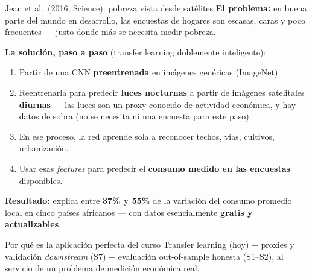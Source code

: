 \documentclass{beamer}
\newcommand{\1}{\mathbb{I}}
\begin{document}
\begin{frame}{Jean et al.\ (2016, Science): pobreza vista desde satélites}
\small
\textbf{El problema:} en buena parte del mundo en desarrollo, las encuestas de hogares son escasas, caras y poco frecuentes --- justo donde más se necesita medir pobreza.
\pause

\vspace{0.15cm}
\textbf{La solución, paso a paso} (transfer learning doblemente inteligente):
\begin{enumerate}\itemsep4pt
  \item Partir de una CNN \textbf{preentrenada} en imágenes genéricas (ImageNet).
  \item Reentrenarla para predecir \textbf{luces nocturnas} a partir de imágenes satelitales \textbf{diurnas} --- las luces son un proxy conocido de actividad económica, y hay datos de sobra (no se necesita ni una encuesta para este paso).
  \item En ese proceso, la red aprende sola a reconocer techos, vías, cultivos, urbanización\ldots
  \item Usar esas \emph{features} para predecir el \textbf{consumo medido en las encuestas} disponibles.
\end{enumerate}
\pause

\textbf{Resultado:} explica entre \textbf{37\% y 55\%} de la variación del consumo promedio local en cinco países africanos --- con datos esencialmente \textbf{gratis y actualizables}.
\pause

\begin{block}{Por qué es la aplicación perfecta del curso}
Transfer learning (hoy) $+$ proxies y validación \emph{downstream} (S7) $+$ evaluación out-of-sample honesta (S1--S2), al servicio de un problema de medición económica real.
\end{block}
\end{frame}
\end{document}
